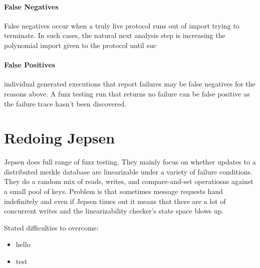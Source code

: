 \paragraph{False Negatives}
False negatives occur when a truly live protocol runs out of import trying to terminate. 
In such cases, the natural next analysis step is increasing the polynomial import given
to the protocol until suc 

\paragraph{False Positives}
individual generated executions that report failures may be false negatives for the reasons above.
A fuzz testing run that returns no failure can be false positive as the failure trace hasn't been discovered. 




\section{Redoing Jepsen}
Jepsen does full range of fuzz testing. 
They mainly focus on whether updates to a distributed merkle database are linearizable under a variety of failure conditions.
They do a random mix of reads, writes, and compare-and-set operatiosns against a small pool of keys.
Problem is that sometimes message requests hand indefinitely and even if Jepsen times out it means that there are a lot of concurrent writes and the linearizability checker's state space blows up.


Stated difficulties to overcome:
\begin{itemize}
    \item hello
    \item test
\end{itemize}
